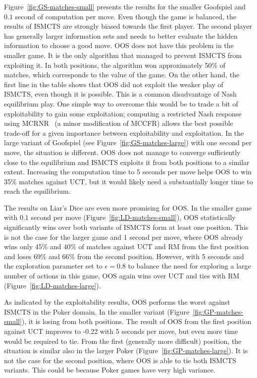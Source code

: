 \documentclass{aamas2015}
\begin{document}
Figure~\ref{fig:GS-matches-small} presents the results for the smaller Goofspiel and $0.1$ second of computation per move. Even though the game is balanced, the results of ISMCTS are strongly biased towards the first player. The second player has generally larger information sets and needs to better evaluate the hidden information to choose a good move. OOS does not have this problem in the smaller game. It is the only algorithm that managed to prevent ISMCTS from exploiting it.
In both positions, the algorithm won approximately 50\% of matches, which corresponds to the value of the game.
On the other hand, the first line in the table shows that OOS did not exploit the weaker play of ISMCTS, even though it is possible. This is a common disadvantage of Nash equilibrium play. %
One simple way to overcome this would be to trade a bit of exploitability to gain some exploitation; computing a restricted Nash response using MCRNR~\cite{Ponsen11Computing} (a minor modification of MCCFR) allows the best possible trade-off for a given importance between exploitability and exploitation. 
In the large variant of Goofspiel (see Figure~\ref{fig:GS-matches-large}) with one second per move, the situation is different. OOS does not manage to converge sufficiently close to the equilibrium and ISMCTS exploits it from both positions to a similar extent. Increasing the computation time to 5 seconds per move helps OOS to win 35\% matches against UCT, but it would likely need a substantially longer time to reach the equilibrium.

The results on Liar's Dice are even more promising for OOS. In the smaller game with $0.1$ second per move (Figure~\ref{fig:LD-matches-small}), OOS statistically significantly wins over both variants of ISMCTS form at least one position. This is not the case for the larger game and 1 second per move, where OOS already wins only 45\% and 40\% of matches against UCT and RM from the first position and loses 69\% and 66\% from the second position. 
However, with 5 seconds and the exploration parameter set to $\epsilon=0.8$ to balance the need for exploring a large number of actions in this game, OOS again wins over UCT and ties with RM (Figure~\ref{fig:LD-matches-large}).

As indicated by the exploitability results, OOS performs the worst against ISMCTS in the Poker domain. In the smaller variant (Figure~\ref{fig:GP-matches-small}), it is losing from both positions. The result of OOS from the first position against UCT improves to -0.22 with 5 seconds per move, but even more time would be required to tie. From the first (generally more difficult) position, the situation is similar also in the larger Poker (Figure~\ref{fig:GP-matches-large}). It is not the case for the second position, where OOS is able to tie both ISMCTS variants. 
This could be because Poker games have very high variance. 
\end{document}
